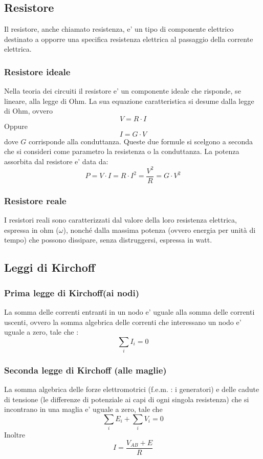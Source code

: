 \documentclass[a4paper, 10pt]{article}
\begin{document}
		\subsection{Resistore}
			Il resistore, anche chiamato resistenza, e' un tipo di componente elettrico destinato a opporre una 
			specifica resistenza elettrica al passaggio della corrente elettrica.
			\subsubsection{Resistore ideale}
				Nella teoria dei circuiti il resistore e' un componente ideale che risponde, se lineare, alla legge di Ohm. 
				La sua equazione caratteristica si desume dalla legge di Ohm, ovvero 
				\[ V = R \cdot I \]
				Oppure 
				\[I = G \cdot V \] dove $G$ corrisponde alla conduttanza. Queste due formule si scelgono a seconda che 
				si consideri come parametro la resistenza o la conduttanza.  La potenza assorbita dal resistore e' data da:
				\[ P = V \cdot I = R \cdot I^2 = \frac{V^2}{R} = G \cdot V^2 \]
			\subsubsection{Resistore reale}
				I resistori reali sono caratterizzati dal valore della loro resistenza elettrica, espressa in ohm ($\omega$), 
				nonché dalla massima potenza (ovvero energia per unità di tempo) che possono dissipare, senza distruggersi, 
				espressa in watt.
		\subsection{Leggi di Kirchoff}
			\subsubsection{Prima legge di Kirchoff(ai nodi)}
				La somma delle correnti entranti in un nodo e' uguale alla somma delle correnti uscenti, ovvero la somma 
				algebrica delle correnti che interessano un nodo e' uguale a zero, tale che :
				\[ {\sum}_i I_i = 0 \]
			\subsubsection{Seconda legge di Kirchoff (alle maglie)}
				La somma algebrica delle forze elettromotrici (f.e.m. : i generatori) e delle cadute di tensione
				(le differenze di potenziale ai capi di ogni singola resistenza) che si incontrano in una maglia e' uguale
				a zero, tale che 
				\[ {\sum}_i E_i + {\sum}_i V_i = 0 \]
				Inoltre
				\[ I = \frac{V_{AB} + E}{R} \]
\end{document}
